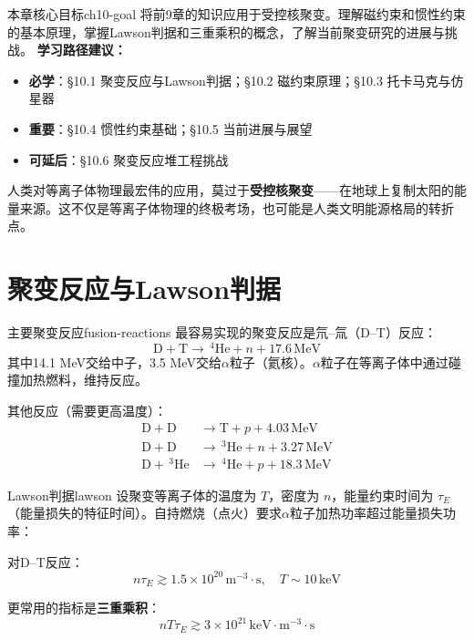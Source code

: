 \documentclass[12pt,a4paper,openany,oneside]{book}
\newcommand{\difficulty}[1]{\marginnote{\textcolor{red}{\textbf{[#1]}}}}
\begin{document}
\begin{insight}{本章核心目标}{ch10-goal}
将前9章的知识应用于受控核聚变。理解磁约束和惯性约束的基本原理，掌握Lawson判据和三重乘积的概念，了解当前聚变研究的进展与挑战。
\tcblower
\textbf{学习路径建议：}

\begin{itemize}[leftmargin=*]
\item[\textcolor{red}{$\blacksquare$}] \textbf{必学}：\S10.1 聚变反应与Lawson判据；\S10.2 磁约束原理；\S10.3 托卡马克与仿星器
\item[\textcolor{orange}{$\blacksquare$}] \textbf{重要}：\S10.4 惯性约束基础；\S10.5 当前进展与展望
\item[\textcolor{green}{$\blacksquare$}] \textbf{可延后}：\S10.6 聚变反应堆工程挑战
\end{itemize}
\end{insight}

人类对等离子体物理最宏伟的应用，莫过于\textbf{受控核聚变}——在地球上复制太阳的能量来源。这不仅是等离子体物理的终极考场，也可能是人类文明能源格局的转折点。

\section{聚变反应与Lawson判据}\difficulty{基础}

\begin{definition}{主要聚变反应}{fusion-reactions}
最容易实现的聚变反应是氘--氚（D--T）反应：
\[
\mathrm{D} + \mathrm{T} \rightarrow \,^4\mathrm{He} + n + 17.6\,\mathrm{MeV}
\]
其中14.1 MeV交给中子，3.5 MeV交给$\alpha$粒子（氦核）。$\alpha$粒子在等离子体中通过碰撞加热燃料，维持反应。

其他反应（需要更高温度）：
\begin{align*}
\mathrm{D} + \mathrm{D} &\rightarrow \mathrm{T} + p + 4.03\,\mathrm{MeV} \\
\mathrm{D} + \mathrm{D} &\rightarrow \,^3\mathrm{He} + n + 3.27\,\mathrm{MeV} \\
\mathrm{D} + \,^3\mathrm{He} &\rightarrow \,^4\mathrm{He} + p + 18.3\,\mathrm{MeV}
\end{align*}
\end{definition}

\begin{theorem}{Lawson判据}{lawson}
设聚变等离子体的温度为 $T$，密度为 $n$，能量约束时间为 $\tau_E$（能量损失的特征时间）。自持燃烧（点火）要求$\alpha$粒子加热功率超过能量损失功率：

对D--T反应：
\[
n\tau_E \gtrsim 1.5\times 10^{20}\,\mathrm{m}^{-3}\cdot\mathrm{s}, \quad T \sim 10\,\mathrm{keV}
\]

更常用的指标是\textbf{三重乘积}：
\[
n T \tau_E \gtrsim 3\times 10^{21}\,\mathrm{keV}\cdot\mathrm{m}^{-3}\cdot\mathrm{s}
\]
\end{theorem}
\end{document}
